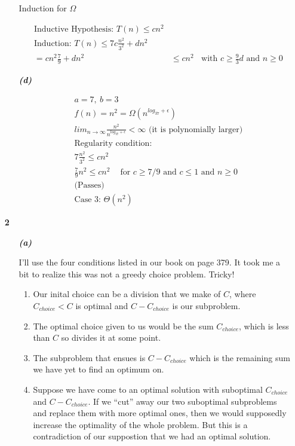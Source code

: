\documentclass{article}
\begin{document}
\begin{enumerate}
\begin{enumerate}
			Induction for $\Omega$

			\begin{align*}
			& \text{Inductive Hypothesis: } T(n) \leq cn^2\\
			& \text{Induction: } T(n) \leq 7c\frac{n^2}{3^2} + dn^2 \\
			& = cn^2 \frac{7}{9} + dn^2 \ \ & \leq cn^2 \ \ \ \ \text{with $c \geq \frac{9}{3}d$ and $n \geq 0$}
			\end{align*}

		\item[\textbf{\emph{(d)}}]

			\begin{align*}
			& a = 7,\ b = 3 \\
			& f(n) = n^2 = \Omega(n^{log_37 + \epsilon}) \\
			& lim_{n\rightarrow \infty}\frac{n^2}{n^{log_37+ \epsilon}} < \infty \text{   (it is polynomially larger)} \\
			& \text{Regularity condition:} \\
			& 7\frac{n^2}{3^2} \leq cn^2 \\ 
			& \frac{7}{9}n^2 \leq cn^2 \ \ \ \ \text{ for $c \geq 7/9$ and $c \leq 1$ and $n \geq 0$}\\ 
			& \text{(Passes)} \\
			& \text{Case 3: } \Theta(n^2)
			\end{align*}

	\end{enumerate}

	\item[\textbf{2}]
	
		\begin{enumerate}
		\item[\textbf{\emph{(a)}}]
			
			I'll use the four conditions listed in our book on page 379. It took me a
			bit to realize this was not a greedy choice problem. Tricky!

			\begin{enumerate}
			\item Our inital choice can be a division that we make of $C$, where
			$C_{choice} < C$ is optimal and $C-C_{choice}$ is our subproblem.
			\item The optimal choice given to us would be the sum $C_{choice}$, which
			is less than $C$ so divides it at some point.
			\item The subproblem that ensues is $C- C_{choice}$ which is the
			remaining sum we have yet to find an optimum on.
			\item Suppose we have come to an optimal solution with suboptimal
			$C_{choice}$ and $C-C_{choice}$. If we ``cut'' away our two suboptimal
			subproblems and replace them with more optimal ones, then we would
			supposedly increase the optimality of the whole problem. But this is a
			contradiction of our suppostion that we had an optimal solution.
			\end{enumerate}


\end{enumerate}
\end{enumerate}
\end{document}
